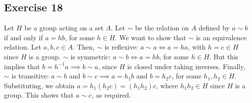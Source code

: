 \subsection*{Exercise 18}
Let $H$ be a group acting on a set $A$. Let $\sim$ be the relation on $A$ defined by $a \sim b$ if and only if $a = hb$, for some $h \in H$. We want to show that $\sim$ is an equivalence relation. Let $a,b,c \in A$. Then, $\sim$ is reflexive: $a \sim a \iff a = ha$, with $h = e \in H$ since $H$ is a group. $\sim$ is symmetric: $a \sim b \iff a = hb$, for some $h \in H$. But this implies that $b = h^{-1}a \implies b \sim a$, since $H$ is closed under taking inverses. Finally, $\sim$ is transitive: $a \sim b$ and $b \sim c \implies a = h_1b$ and $b = h_2c$, for some $h_1,h_2 \in H$. Substituting, we obtain $a = h_1(h_2c) = (h_1h_2)c$, where $h_1h_2 \in H$ since $H$ is a group. This shows that $a \sim c$, as required. 